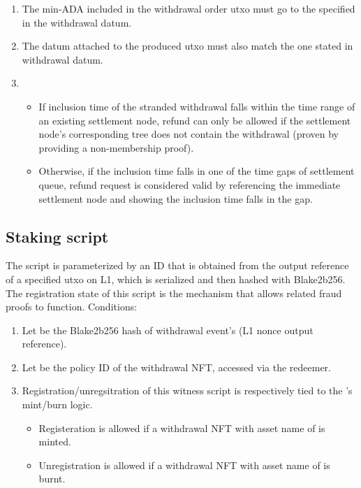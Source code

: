 \documentclass[../midgard.tex]{subfiles}
\begin{document}
\begin{description}
\begin{enumerate}
      \item The min-ADA included in the withdrawal order utxo must go to the  specified in the withdrawal datum.
      \item The datum attached to the produced utxo must also match the one stated in withdrawal datum.
      \item 
        \begin{itemize}
          \item If inclusion time of the stranded withdrawal falls within the time range of an existing settlement node, refund can only be allowed if the settlement node's corresponding tree does not contain the withdrawal (proven by providing a non-membership proof).
          \item Otherwise, if the inclusion time falls in one of the time gaps of settlement queue, refund request is considered valid by referencing the immediate settlement node and showing the inclusion time falls in the gap.
        \end{itemize}
    \end{enumerate}
\end{description}

\subsection{Staking script}
\label{h:withdrawal-order-staking-script}
The  script is parameterized by an ID that is obtained from the output reference of a specified utxo on L1, which is serialized and then hashed with Blake2b256.
The registration state of this script is the mechanism that allows related fraud proofs to function.
Conditions:

\begin{enumerate}
  \item Let  be the Blake2b256 hash of withdrawal event's  (L1 nonce output reference).
  \item Let  be the policy ID of the withdrawal NFT, accessed via the redeemer.
  \item Registration/unregsitration of this witness script is respectively tied to the 's mint/burn logic. 
    \begin{itemize}
      \item Registeration is allowed if a withdrawal NFT with asset name of  is minted.
      \item Unregistration is allowed if a withdrawal NFT with asset name of  is burnt.
    \end{itemize}
\end{enumerate}
\end{document}
